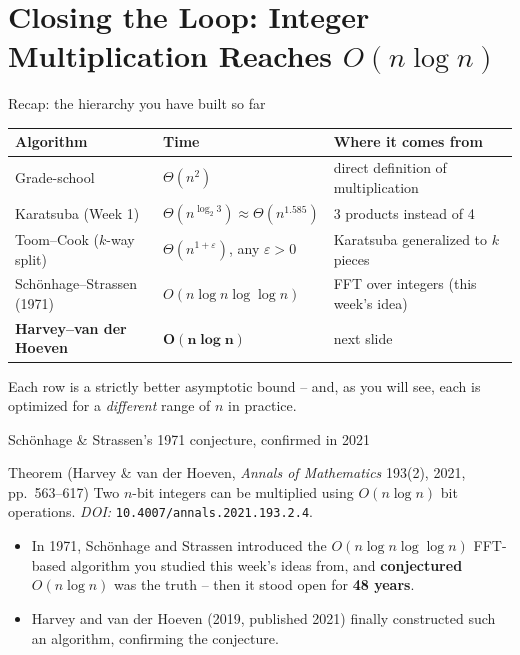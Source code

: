 \documentclass[11pt,aspectratio=169]{beamer}
\begin{document}
\section{Closing the Loop: Integer Multiplication Reaches $O(n\log n)$}

\begin{frame}{Recap: the hierarchy you have built so far}
  \small
  \begin{center}
  \begin{tabular}{@{}lll@{}}
    \toprule
    Algorithm & Time & Where it comes from \\
    \midrule
    Grade-school & $\Theta(n^2)$ & direct definition of multiplication \\
    Karatsuba (Week 1) & $\Theta(n^{\log_2 3}) \approx \Theta(n^{1.585})$ & 3 products
    instead of 4 \\
    Toom--Cook ($k$-way split) & $\Theta(n^{1+\varepsilon})$, any $\varepsilon>0$ & Karatsuba
    generalized to $k$ pieces \\
    Sch\"onhage--Strassen (1971) & $O(n\log n\log\log n)$ & FFT over integers (this week's
    idea) \\
    \textbf{Harvey--van der Hoeven} & $\boldsymbol{O(n\log n)}$ & next slide \\
    \bottomrule
  \end{tabular}
  \end{center}
  Each row is a strictly better asymptotic bound -- and, as you will see, each is
  optimized for a \emph{different} range of $n$ in practice.
\end{frame}

\begin{frame}{Schönhage \& Strassen's 1971 conjecture, confirmed in 2021}
  \begin{block}{Theorem (Harvey \& van der Hoeven, \emph{Annals of Mathematics} 193(2),
  2021, pp.\ 563--617)}
    Two $n$-bit integers can be multiplied using $O(n\log n)$ bit operations. \emph{DOI:}
    \texttt{10.4007/annals.2021.193.2.4}.
  \end{block}
  \begin{itemize}
    \item In 1971, Schönhage and Strassen introduced the $O(n\log n\log\log n)$ FFT-based
    algorithm you studied this week's ideas from, and \textbf{conjectured} $O(n\log n)$
    was the truth -- then it stood open for \textbf{48 years}.
    \item Harvey and van der Hoeven (2019, published 2021) finally constructed such an
    algorithm, confirming the conjecture.
  \end{itemize}
\end{frame}
\end{document}
